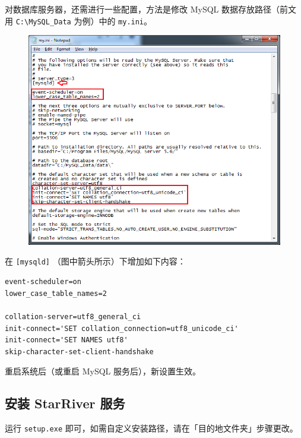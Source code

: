 对数据库服务器，还需进行一些配置，方法是修改 MySQL 数据存放路径（前文用
\texttt{C:\textbackslash{}MySQL\_Data} 为例）中的 \texttt{my.ini}。

\begin{figure}[htbp]
\centering
\includegraphics{img/my_ini.png}
\end{figure}

在 \texttt{{[}mysqld{]}} （图中箭头所示）下增加如下内容：

\begin{verbatim}
event-scheduler=on
lower_case_table_names=2

collation-server=utf8_general_ci
init-connect='SET collation_connection=utf8_unicode_ci'
init-connect='SET NAMES utf8'
skip-character-set-client-handshake
\end{verbatim}

重启系统后（或重启 MySQL 服务后），新设置生效。

\subsection{安装 StarRiver
服务}\label{ux5b89ux88c5-starriver-ux670dux52a1}

运行 \texttt{setup.exe}
即可，如需自定义安装路径，请在「目的地文件夹」步骤更改。

